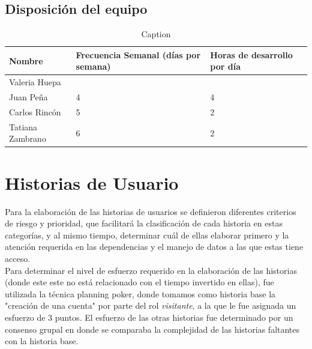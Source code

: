\documentclass[a4paper,12 pt]{article}
\begin{document}
\subsection{Disposición del equipo}

\begin{table}[H]
    \centering
    \small{
    \begin{tabular}{|M{2cm}|M{4cm}|M{4cm}|}
        \hline
        \textbf{Nombre}    & \textbf{Frecuencia Semanal (días por semana)}   
        &\textbf{Horas de desarrollo por día}\\
        \hline
        Valeria Huepa   &       &       \\
        \hline
        Juan Peña       &   4    &    4   \\
        \hline
        Carlos Rincón   &   5    &  2     \\
        \hline
        Tatiana Zambrano    & 6      &  2     \\
        \hline
    \end{tabular}
    \caption{Caption}
    \label{tab:my_label}}
\end{table}{}

\section{Historias de Usuario}

Para la elaboración de las historias de usuarios se definieron diferentes
criterios de riesgo y prioridad, que facilitará la clasificación de cada
historia en estas categorías, y al mismo tiempo, determinar cuál de ellas
elaborar primero y la atención requerida en las dependencias y el manejo de
datos a las que estas tiene acceso.\\

Para determinar el nivel de esfuerzo requerido en la elaboración de las
historias (donde este este no está relacionado con el tiempo invertido en
ellas), fue utilizada la técnica planning poker, donde tomamos como historia
base la "creación de una cuenta" por parte del rol \textit{visitante}, a la que
le fue asignada un esfuerzo de 3 puntos. El esfuerzo de las otras historias fue
determinado por un consenso grupal en donde se comparaba la complejidad de las
historias faltantes con la historia base.\\
\end{document}
